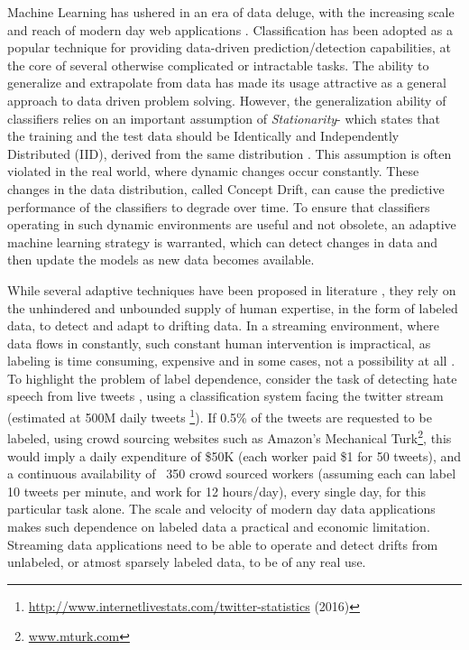 \documentclass[authoryear,3p,times,twocolumn]{elsarticle}
\begin{document}
Machine Learning has ushered in an era of data deluge, with the increasing scale and reach of modern day web applications \citep{wu2014data}. Classification has been adopted as a popular technique for providing data-driven prediction/detection capabilities, at the core of several otherwise complicated or intractable tasks. The ability to generalize and extrapolate from data has made its usage attractive as a general approach to data driven problem solving. However, the generalization ability of classifiers relies on an important assumption of \textit{Stationarity}- which states that the training and the test data should be Identically and Independently Distributed (IID), derived from the same distribution \citep{zliobaite2010change}. This assumption is often violated in the real world, where dynamic changes occur constantly. These changes in the data distribution, called Concept Drift, can cause the predictive performance of the classifiers to degrade over time. To ensure that classifiers operating in such dynamic environments are useful and not obsolete, an adaptive machine learning strategy is warranted, which can detect changes in data and then update the models as new data becomes available. 

While several adaptive techniques have been proposed in literature \citep{gama2004learning, baena2006early,bifet2007learning, goncalves2014comparative}, they rely on the unhindered and unbounded supply of human expertise, in the form of labeled data, to detect and adapt to drifting data. In a streaming environment, where data flows in constantly, such constant human intervention is impractical, as labeling is time consuming, expensive and in some cases, not a possibility at all   \citep{lughofer2016recognizing, krempl2014open}.  To highlight the problem of label dependence, consider the task of detecting hate speech from live tweets \citep{burnap2016us}, using a classification system facing the twitter stream (estimated at 500M daily tweets \footnote{\url{http://www.internetlivestats.com/twitter-statistics} (2016)}). If 0.5\% of the tweets are requested to be labeled, using crowd sourcing websites such as Amazon's Mechanical Turk\footnote{\url{www.mturk.com}}, this would imply a daily expenditure of \$50K (each worker paid \$1 for 50 tweets), and a continuous availability of ~350 crowd sourced workers (assuming each can label 10 tweets per minute, and work for 12 hours/day), every single day, for this particular task alone. The scale and velocity of modern day data applications makes such dependence on labeled data a practical and economic limitation. Streaming data applications need to be able to operate and detect drifts from unlabeled, or atmost sparsely labeled data, to be of any real use. 
\end{document}
